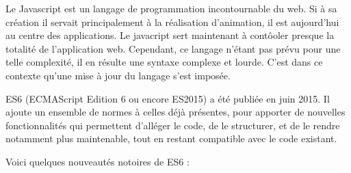 \documentclass[12pt,a4paper]{article}
\begin{document}
  \bigskip

  Le Javascript est un langage de programmation incontournable du web. Si
  à sa création il servait principalement à la réalisation d'animation, il
  est aujourd'hui au centre des applications. Le javacript sert maintenant
  à contôoler presque la totalité de l'application web. Cependant, ce
  langage n'étant pas prévu pour une telle complexité, il en résulte une
  syntaxe complexe et lourde. C'est dans ce contexte qu'une mise à jour du
  langage s'est imposée.

  \bigskip

  ES6 (ECMAScript Edition 6 ou encore ES2015) a été publiée en juin 2015.
  Il ajoute un ensemble de normes à celles déjà présentes, pour apporter
  de nouvelles fonctionnalités qui permettent d'alléger le code, de le
  structurer, et de le rendre notamment plus maintenable, tout en restant
  compatible avec le code existant.

  \bigskip

  Voici quelques nouveautés notoires de ES6 :
\end{document}
